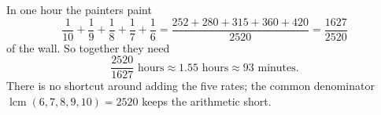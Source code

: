 In one hour the painters paint
\[\dfrac{1}{10}+\dfrac{1}{9}+\dfrac{1}{8}+\dfrac{1}{7}+\dfrac{1}{6}=\dfrac{252+280+315+360+420}{2520}=\dfrac{1627}{2520}\]
of the wall. So together they need
\[\boxed{\dfrac{2520}{1627}\text{ hours}}\approx1.55\text{ hours}\approx93\text{ minutes}.\]
There is no shortcut around adding the five rates; the common denominator $\operatorname{lcm}(6,7,8,9,10)=2520$ keeps the arithmetic short.
